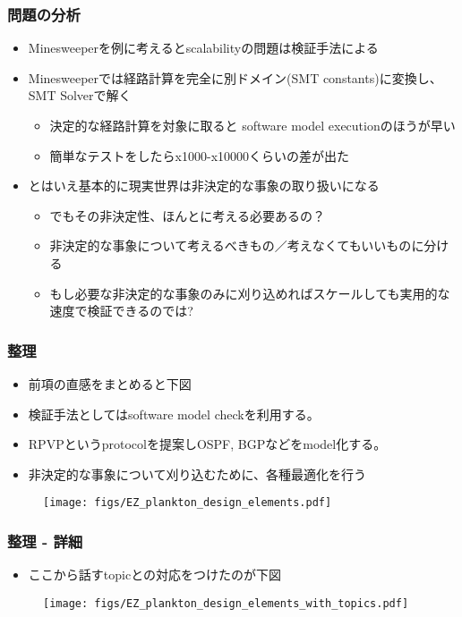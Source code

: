 \documentclass[dvipdfmx,9pt,notheorems]{beamer}
\theoremstyle{definition}
\begin{document}
\begin{frame}\frametitle{問題の分析}
	\begin{itemize}
		\item Minesweeperを例に考えるとscalabilityの問題は検証手法による
		\item Minesweeperでは経路計算を完全に別ドメイン(SMT constants)に変換し、SMT Solverで解く
		\begin{itemize}
			\item 決定的な経路計算を対象に取ると{\color{orange} software model execution}のほうが早い
			\item 簡単なテストをしたらx1000-x10000くらいの差が出た
		\end{itemize}
		\item とはいえ基本的に現実世界は非決定的な事象の取り扱いになる
		\begin{itemize}
			\item でもその非決定性、ほんとに考える必要あるの？
			\item 非決定的な事象について{\color{orange}考えるべきもの／考えなくてもいいもの}に分ける
			\item もし{\color{orange}必要な非決定的な事象のみに刈り込めれば}スケールしても実用的な速度で検証できるのでは?
		\end{itemize}
	\end{itemize}
\pnote{
}
\end{frame}

\begin{frame}\frametitle{整理}
	\begin{itemize}
		\item 前項の直感をまとめると下図
		\item 検証手法としてはsoftware model checkを利用する。
		\item RPVPというprotocolを提案しOSPF, BGPなどをmodel化する。
		\item 非決定的な事象について刈り込むために、各種最適化を行う
	\end{itemize}
  \begin{figure}[htb]
    \centering
    \texttt{[image: figs/EZ\_plankton\_design\_elements.pdf]}
  \end{figure}%
\pnote{
}
\end{frame}



\begin{frame}\frametitle{整理 - 詳細}
	\begin{itemize}
		\item ここから話すtopicとの対応をつけたのが下図
	\end{itemize}
  \begin{figure}[htb]
    \centering
    \texttt{[image: figs/EZ\_plankton\_design\_elements\_with\_topics.pdf]}
  \end{figure}%
\end{frame}
\end{document}
